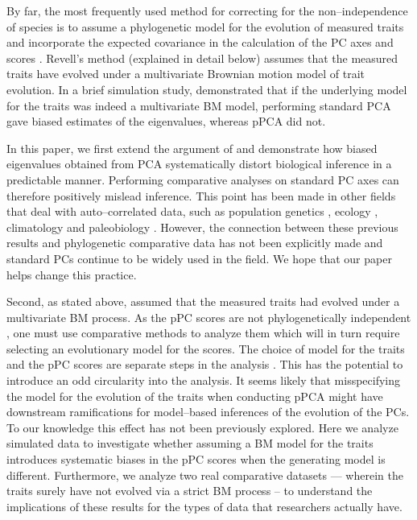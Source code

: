 \documentclass[a4paper,11pt]{article}
\begin{document}
By far, the most frequently used method for correcting for the non--independence of species is to assume a phylogenetic model for the evolution of measured traits and incorporate the expected covariance in the calculation of the PC axes and scores \citep{Revell2008}. Revell's method (explained in detail below) assumes that the measured traits have evolved under a multivariate Brownian motion \citep[BM;][]{Edwards1964} model of trait evolution. In a brief simulation study, \citet{Revell2008} demonstrated that if the underlying model for the traits was indeed a multivariate BM model, performing standard PCA gave biased estimates of the eigenvalues, whereas pPCA did not.

In this paper, we first extend the argument of \citet{Revell2008} and demonstrate how biased eigenvalues obtained from PCA systematically distort biological inference in a predictable manner. Performing comparative analyses on standard PC axes can therefore positively mislead inference. This point has been made in other fields that deal with auto--correlated data, such as population genetics \citep{Novembre}, ecology \citep{Podani2002}, climatology \citep{Richman1986} and paleobiology \citep{Bookstein2012}. However, the connection between these previous results and phylogenetic comparative data has not been explicitly made and standard PCs continue to be widely used in the field. We hope that our paper helps change this practice.

Second, as stated above, \citet{Revell2008} assumed that the measured traits had evolved under a multivariate BM process. As the pPC scores are not phylogenetically independent \citep[][see below]{Revell2008, Polly2013}, one must use comparative methods to analyze them which will in turn require selecting an evolutionary model for the scores. The choice of model for the traits and the pPC scores are separate steps in the analysis \citep{Revell2008}. 
This has the potential to introduce an odd circularity into the analysis. It seems likely that misspecifying the model for the evolution of the traits when conducting pPCA might have downstream ramifications for model--based inferences of the evolution of the PCs. To our knowledge this effect has not been previously explored. Here we analyze simulated data to investigate whether assuming a BM model for the traits introduces systematic biases in the pPC scores when the generating model is different. Furthermore, we analyze two real comparative datasets --- wherein the traits surely have not evolved via a strict BM process -- to understand the implications of these results for the types of data that researchers actually have.
\end{document}
